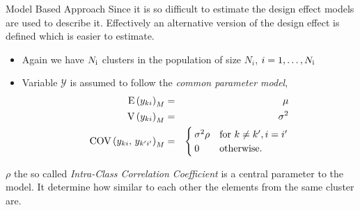 \documentclass[10pt]{beamer}\usepackage[]{graphicx}\usepackage[]{color}
\newcommand{\E}[1]{\text{E}\left(#1\right)}
\newcommand{\V}[1]{\text{V}\left(#1\right)}
\newcommand{\COV}[2]{\text{COV}\left(#1,\,#2\right)}
\newcommand{\RN}[1]{%
  \textup{\uppercase\expandafter{\romannumeral#1}}%
}
\begin{document}


\begin{frame}{Model Based Approach}
Since it is so difficult to estimate the design effect models are used to describe it. Effectively an alternative version of the design effect is defined which is easier to estimate.
	\begin{itemize}
		\item Again we have $N_{\RN{1}}$ clusters in the population of size $N_i$, $i=1,\dots,N_{\RN{1}}$
		\item Variable $\mathcal{Y}$ is assumed to follow the \emph{common parameter model},
		\begin{eqnarray*}
		  \E{y_{ki}}_{M} &=& \mu \\
		  \notag\V{ y_{ki}}_{M}	&	=	&	\sigma^2 \\
			\COV{y_{ki}}{y_{k'i'}}_{M}	&	=	&
																\begin{cases}%
																	\sigma^2 \rho & \text{for } k\neq k', i = i'
																	\\
																	0							& \text{otherwise.}
																\end{cases}%
		\end{eqnarray*}%
	\end{itemize}
	$\rho$ the so called \emph{Intra-Class Correlation Coefficient} is a central parameter to the model. It determine how similar to each other the elements from the same cluster are.
	
\end{frame}
\end{document}
